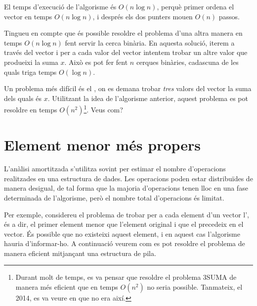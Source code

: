 \begin{center}
\end{center}


El temps d'execució de l'algorisme és $O(n \log n)$, perquè primer
ordena el vector en temps $O(n \log n)$, i després els dos punters
mouen $O(n)$ passos.

Tingueu en compte que és possible resoldre el problema d'una altra
manera en temps $O(n \log n)$ fent servir la cerca binària. En aquesta
solució, iterem a través del vector i per a cada valor del vector
intentem trobar un altre valor que produeixi la suma $x$. Això es pot
fer fent $n$ cerques binàries, cadascuna de les quals triga temps
$O(\log n)$.

 Un problema més difícil és el ,
on es demana trobar \emph{tres} valors del vector la suma dels quals és $x$.
Utilitzant la idea de l'algorisme anterior, aquest problema es pot resoldre
en temps $O(n^2)$\footnote{Durant molt de temps, es va pensar que resoldre el
problema 3SUMA de manera més eficient que en temps $O(n^2) $ no seria
possible. Tanmateix, el 2014, es va veure en \cite{gro14} que no era així.}.
Veus com?

\section{Element menor més propers}


L'anàlisi amortitzada s'utilitza sovint per estimar el nombre
d'operacions realitzades en una estructura de dades. Les operacions
poden estar distribuïdes de manera desigual, de tal forma que la
majoria d'operacions tenen lloc en una fase determinada de
l'algorisme, però el nombre total d'operacions és limitat.

Per exemple, considereu el problema de trobar per a cada element d'un
vector l', és a dir, el primer element
menor que l'element original i que el precedeix en el vector. És
possible que no existeixi aquest element, i en aquest cas l'algorisme
hauria d'informar-ho. A continuació veurem com es pot resoldre el
problema de manera eficient mitjançant una estructura de pila.

